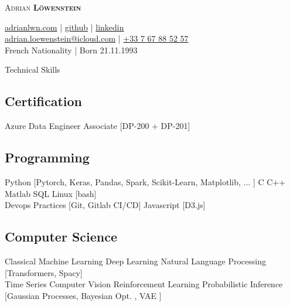 \documentclass{article}
\newcommand{\longdescript}[1]{\color{subheadings}\normalfont\small {#1\\} }
\newcommand{\sectionsep}[0]{\vspace{-6pt}}
\newcommand{\namesection}[4]{
	\begin{center}
		\sffamily
		\headingfont\fontsize{35pt}{14pt}\selectfont\scshape #1 
			\headingfont\selectfont\scshape\bfseries #2
	\end{center}
	\vspace{-14pt}
		\begin{center} \color{subheadings}\normalfont\fontsize{11pt}{14pt}\selectfont #3
		\end{center}
	
	\vspace{-5pt}
	}
\newcommand{\mybullet}[1]{ \hspace{2pt}\textbullet{#1}\hspace{2pt} }
\begin{document}

\namesection{Adrian}{Löwenstein}{\href{https://www.adrianlwn.com}{\faGlobe{} adrianlwn.com} | \href{https://github.com/adrianlwn}{\faGithubSquare{}  github}  | \href{https://www.linkedin.com/in/adrianloewenstein}{\faLinkedinSquare{}  linkedin} \\ \href{mailto:adrian.loewenstein@icloud.com}{\faEnvelope{} adrian.loewenstein@icloud.com} |  \href{tel:+33767885257}{\faPhoneSquare{} +33 7 67 88 52 57}  \\ French Nationality | Born 21.11.1993}





\section{Technical Skills}

\subsection{Certification} 
\longdescript{Azure Data Engineer Associate [DP-200 + DP-201]
}
\sectionsep

\subsection{Programming}
\longdescript{Python [Pytorch, Keras, Pandas, Spark, Scikit-Learn, Matplotlib, ... ] \mybullet{} C \mybullet{} C++ \mybullet{} Matlab \mybullet{} SQL\mybullet{} Linux [bash] \\ \hspace*{3pt} Devops Practices [Git, Gitlab CI/CD]  \mybullet{} Javascript [D3.js]   }
\sectionsep

\subsection{Computer Science} 
\longdescript{ Classical Machine Learning \mybullet{} Deep Learning \mybullet{} Natural Language Processing [Transformers, Spacy]  \\ \hspace*{3pt} Time Series \mybullet{} Computer Vision \mybullet{} Reinforcement Learning  \mybullet{} Probabilistic Inference [Gaussian Processes, Bayesian Opt. , VAE ]   } 
\sectionsep
\end{document}
